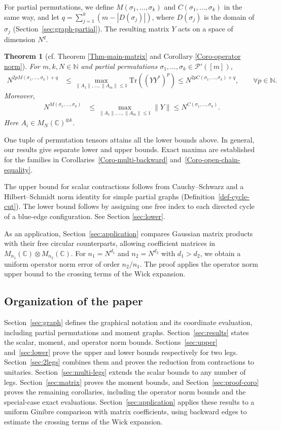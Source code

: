 \documentclass[12pt]{article}
\numberwithin{equation}{section}
\theoremstyle{plain}
\newtheorem*{theorem*}{Theorem}
\def\bN{\mathbb N}
\def\bC{\mathbb C}
\def\cP{\mathcal P}
\def\Tr{\mathrm {Tr}}
\begin{document}
For partial permutations, we define $M(\sigma_1,\ldots,\sigma_k)$ and $C(\sigma_1,\ldots,\sigma_k)$ in the same way, and let $q=\sum_{j=1}^k(m-|D(\sigma_j)|)$, where $D(\sigma_j)$ is the domain of $\sigma_j$ (Section~\ref{sec:graph-partial}). The resulting matrix $Y$ acts on a space of dimension $N^q$.
\begin{theorem*}[cf. Theorem \ref{Thm-main-matrix} and Corollary \ref{Coro-operator norm}]
For $m,k,N\in\bN$ and partial permutations $\sigma_1,\ldots,\sigma_k\in\cP'([m])$,
\begin{align*}
N^{2pM(\sigma_1,\ldots,\sigma_k)+q} & \le \max_{\|A_1\|,\ldots,\|A_m\|\le1} \Tr((YY^*)^p) \le N^{2pC(\sigma_1,\ldots,\sigma_k)+q},\qquad \forall p\in\bN.
\end{align*}
Moreover,
\begin{align*}
    N^{M(\sigma_1,\ldots,\sigma_k)}&\le \max_{\|A_1\|,\ldots,\|A_m\|\le1} \|Y\|\le N^{C(\sigma_1,\ldots,\sigma_k)}.
\end{align*}
Here $A_i\in M_N(\bC)^{\otimes k}$.
\end{theorem*}

One tuple of permutation tensors attains all the lower bounds above. In general, our results give separate lower and upper bounds. Exact maxima are established for the families in Corollaries~\ref{Coro-multi-backward} and~\ref{Coro-open-chain-equality}.

The upper bound for scalar contractions follows from Cauchy--Schwarz and a Hilbert--Schmidt norm identity for simple partial graphs (Definition~\ref{def-cycle-cut}). The lower bound follows by assigning one free index to each directed cycle of a blue-edge configuration. See Section \ref{sec:lower}.

As an application, Section~\ref{sec:application} compares Gaussian matrix products with their free circular counterparts, allowing coefficient matrices in $M_{n_1}(\bC)\otimes M_{n_2}(\bC)$. For $n_1=N^{d_1}$ and $n_2=N^{d_2}$ with $d_1>d_2$, we obtain a uniform operator norm error of order $n_2/n_1$. The proof applies the operator norm upper bound to the crossing terms of the Wick expansion.

\subsection*{Organization of the paper}
Section~\ref{sec:graph} defines the graphical notation and its coordinate evaluation, including partial permutations and moment graphs. Section~\ref{sec:results} states the scalar, moment, and operator norm bounds. Sections~\ref{sec:upper} and~\ref{sec:lower} prove the upper and lower bounds respectively for two legs. Section~\ref{sec:2legs} combines them and proves the reduction from contractions to unitaries. Section~\ref{sec:multi-legs} extends the scalar bounds to any number of legs. Section~\ref{sec:matrix} proves the moment bounds, and Section~\ref{sec:proof-coro} proves the remaining corollaries, including the operator norm bounds and the special-case exact evaluations. Section~\ref{sec:application} applies these results to a uniform Ginibre comparison with matrix coefficients, using backward edges to estimate the crossing terms of the Wick expansion.
\end{document}
